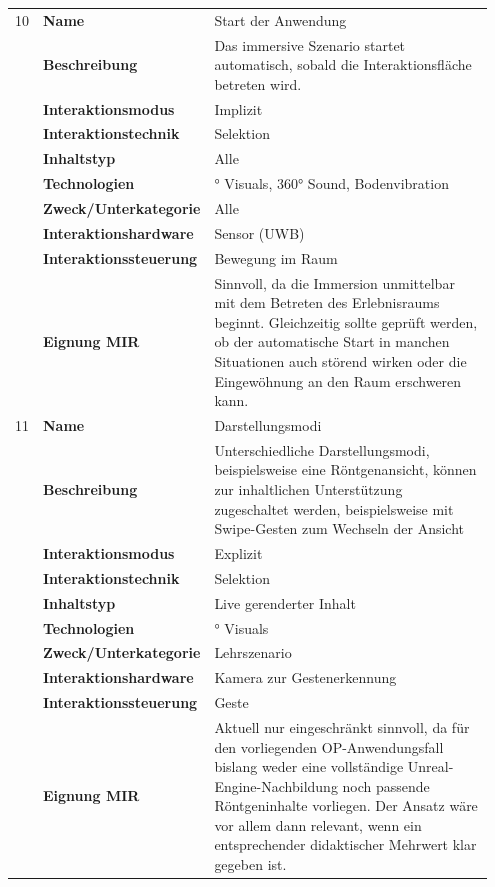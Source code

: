 \begin{longtable}{p{0.03\linewidth} p{0.27\linewidth}
    >{\raggedright\arraybackslash}p{0.65\linewidth}}
    10   & \textbf{Name} & Start der Anwendung \\
        & \textbf{Beschreibung} & Das immersive Szenario startet automatisch, sobald die Interaktionsfläche betreten wird. \\
        & \textbf{Interaktionsmodus} & Implizit \\
        & \textbf{Interaktionstechnik} & Selektion \\
        & \textbf{Inhaltstyp} & Alle \\
        & \textbf{Technologien} & 270° Visuals, 360° Sound, Bodenvibration \\
        & \textbf{Zweck/Unterkategorie} & Alle \\
        & \textbf{Interaktionshardware} & Sensor (UWB) \\
        & \textbf{Interaktionssteuerung} & Bewegung im Raum \\
        & \textbf{Eignung MIR} & Sinnvoll, da die Immersion unmittelbar mit dem Betreten des Erlebnisraums beginnt. Gleichzeitig sollte geprüft werden, ob der automatische Start in manchen Situationen auch störend wirken oder die Eingewöhnung an den Raum erschweren kann. \\
    \midrule

    11   & \textbf{Name} & Darstellungsmodi \\
        & \textbf{Beschreibung} & Unterschiedliche Darstellungsmodi, beispielsweise eine Röntgenansicht, können zur inhaltlichen Unterstützung zugeschaltet werden, beispielsweise mit Swipe-Gesten zum Wechseln der Ansicht \\
        & \textbf{Interaktionsmodus} & Explizit \\
        & \textbf{Interaktionstechnik} & Selektion \\
        & \textbf{Inhaltstyp} & Live gerenderter Inhalt \\
        & \textbf{Technologien} & 270° Visuals \\
        & \textbf{Zweck/Unterkategorie} & Lehrszenario \\
        & \textbf{Interaktionshardware} & Kamera zur Gestenerkennung \\
        & \textbf{Interaktionssteuerung} & Geste \\
        & \textbf{Eignung MIR} & Aktuell nur eingeschränkt sinnvoll, da für den vorliegenden OP-Anwendungsfall bislang weder eine vollständige Unreal-Engine-Nachbildung noch passende Röntgeninhalte vorliegen. Der Ansatz wäre vor allem dann relevant, wenn ein entsprechender didaktischer Mehrwert klar gegeben ist. \\
    \midrule


\end{longtable}

